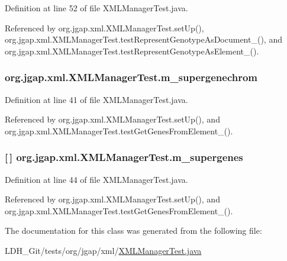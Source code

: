 Definition at line 52 of file X\-M\-L\-Manager\-Test.\-java.



Referenced by org.\-jgap.\-xml.\-X\-M\-L\-Manager\-Test.\-set\-Up(), org.\-jgap.\-xml.\-X\-M\-L\-Manager\-Test.\-test\-Represent\-Genotype\-As\-Document\-\_(), and org.\-jgap.\-xml.\-X\-M\-L\-Manager\-Test.\-test\-Represent\-Genotype\-As\-Element\-\_().

\hypertarget{classorg_1_1jgap_1_1xml_1_1_x_m_l_manager_test_acd8fe429607d69406e1ea56ab75600da}{
\subsubsection[{m\-\_\-supergenechrom}]{ org.\-jgap.\-xml.\-X\-M\-L\-Manager\-Test.\-m\-\_\-supergenechrom\hspace{0.3cm}{\ttfamily [private]}}}\label{classorg_1_1jgap_1_1xml_1_1_x_m_l_manager_test_acd8fe429607d69406e1ea56ab75600da}


Definition at line 41 of file X\-M\-L\-Manager\-Test.\-java.



Referenced by org.\-jgap.\-xml.\-X\-M\-L\-Manager\-Test.\-set\-Up(), and org.\-jgap.\-xml.\-X\-M\-L\-Manager\-Test.\-test\-Get\-Genes\-From\-Element\-\_().

\hypertarget{classorg_1_1jgap_1_1xml_1_1_x_m_l_manager_test_a9f3715ab440292e64878c8f89138056a}{
\subsubsection[{m\-\_\-supergenes}]{ \mbox{[}$\,$\mbox{]} org.\-jgap.\-xml.\-X\-M\-L\-Manager\-Test.\-m\-\_\-supergenes\hspace{0.3cm}{\ttfamily [private]}}}\label{classorg_1_1jgap_1_1xml_1_1_x_m_l_manager_test_a9f3715ab440292e64878c8f89138056a}


Definition at line 44 of file X\-M\-L\-Manager\-Test.\-java.



Referenced by org.\-jgap.\-xml.\-X\-M\-L\-Manager\-Test.\-set\-Up(), and org.\-jgap.\-xml.\-X\-M\-L\-Manager\-Test.\-test\-Get\-Genes\-From\-Element\-\_().



The documentation for this class was generated from the following file\-:\begin{DoxyCompactItemize}
\item 
L\-D\-H\-\_\-\-Git/tests/org/jgap/xml/\hyperlink{_x_m_l_manager_test_8java}{X\-M\-L\-Manager\-Test.\-java}\end{DoxyCompactItemize}
